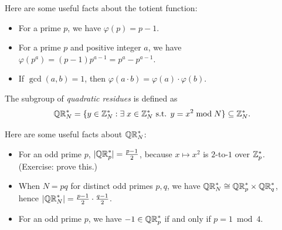 \documentclass[11pt]{article}
\begin{document}
\noindent Here are some useful facts about the totient function:
\begin{itemize}
\item For a prime $p$, we have $\varphi(p) = p - 1$.
\item For a prime $p$ and positive integer $a$, we have $\varphi(p^a)
  = (p-1) p^{a-1} = p^a - p^{a-1}$.
\item If $\gcd(a,b) = 1$, then $\varphi(a \cdot b) = \varphi(a) \cdot
  \varphi(b)$.
\end{itemize}

\begin{definition}
  The subgroup of \emph{quadratic residues} is defined as \[ \mathbb{QR}_{N}^{*}
  = \{y \in \mathbb{Z}_N^{*} : \exists\; x \in \mathbb{Z}_N^{*} \text{ s.t. } y = x^2
    \bmod N\} \subseteq \mathbb{Z}_N^{*}. \]
\end{definition}

\noindent Here are some useful facts about $\mathbb{QR}_{N}^{*}$:
\begin{itemize}
\item For an odd prime $p$, $\lvert\mathbb{QR}_{p}^{*}\rvert = \frac{p-1}{2}$, because
  $x \mapsto x^{2}$ is $2$-to-$1$ over $\mathbb{Z}_p^{*}$.  (Exercise: prove
  this.)

\item When $N = pq$ for distinct odd primes $p,q$, we have $\mathbb{QR}_{N}^{*}
  \cong \mathbb{QR}_{p}^{*} \times \mathbb{QR}_{q}^{*}$, hence $\lvert\mathbb{QR}_{N}^{*}\rvert =
  \frac{p-1}{2} \cdot \frac{q-1}{2}$.

\item For an odd prime $p$, we have $-1 \in \mathbb{QR}_{p}^{*}$ if and only if
  $p = 1 \bmod 4$.
\end{itemize}
\end{document}
